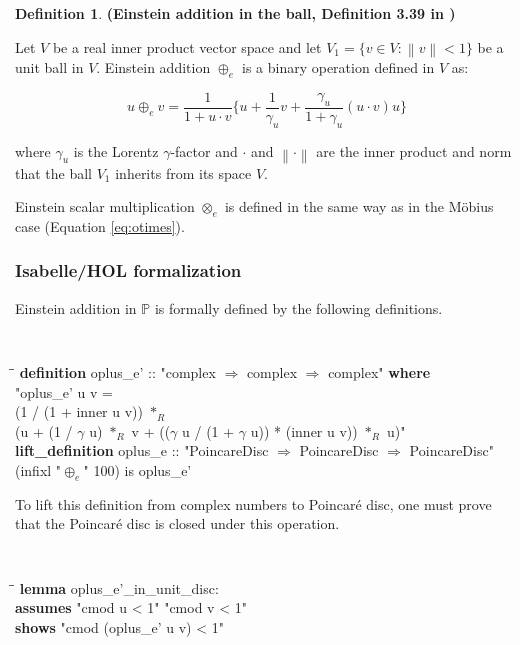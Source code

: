 \documentclass[a4paper]{article}
\newcommand{\tab}{\hspace{5mm}}
\theoremstyle{definition}
\newtheorem{definition}{Definition}[section]
\newcommand{\norm}[1]{\left\lVert#1\right\rVert}
\begin{document}
\begin{definition}\textbf{(Einstein addition in the ball, Definition 3.39 in \cite{ungar-analytic})}
  \label{def:einsteinaddition}

  Let $V$ be a real inner product vector space and let
  $V_1 = \{v\in V: \norm{v}<1\}$ be a unit ball in $V$. Einstein
  addition $\oplus_e$ is a binary operation defined in $V$ as:
  
  $$u \oplus_e v = \frac{1}{1+u\cdot v}\Big\{u+\frac{1}{\gamma_u}v+\frac{\gamma_u}{1+\gamma_u}(u\cdot v)u\Big\}$$
  
  \noindent where $\gamma_u$ is the Lorentz $\gamma$-factor and
  $\cdot$ and $\norm{\cdot}$ are the inner product and norm that the
  ball $V_1$ inherits from its space $V$.
\end{definition}

Einstein scalar multiplication $\otimes_{e}$ is defined in the same
way as in the M\"obius case (Equation \ref{eq:otimes}).

\subsubsection{Isabelle/HOL formalization}

Einstein addition in $\mathbb{P}$ is formally defined by the following
definitions.

{\tt
\begin{small}
\begin{tabbing}
\tab\=\tab\=\kill
{\bf definition} oplus\_e' :: "complex $\Rightarrow$ complex $\Rightarrow$ complex" {\bf where}\\
\>  "oplus\_e' u v = \\
\>\>(1 / (1 + inner u v)) $*_R$\\
\>\>(u + (1 / $\gamma$ u) $*_R$ v + (($\gamma$ u / (1 + $\gamma$ u)) * (inner u v)) $*_R$ u)"\\
{\bf lift\_definition} oplus\_e :: "PoincareDisc $\Rightarrow$ PoincareDisc $\Rightarrow$ PoincareDisc"\\
\> (infixl "$\oplus_e$" 100) is oplus\_e'
\end{tabbing}
\end{small}
}

To lift this definition from complex numbers to Poincar\'e disc, one
must prove that the Poincar\'e disc is closed under this operation.

{\tt
\begin{small}
\begin{tabbing}
\tab\=\tab\=\kill
{\bf lemma} oplus\_e'\_in\_unit\_disc:\\
\>  {\bf assumes} "cmod u < 1" "cmod v < 1"\\
\>  {\bf shows} "cmod (oplus\_e' u v) < 1"
\end{tabbing}
\end{small}
}
\end{document}
